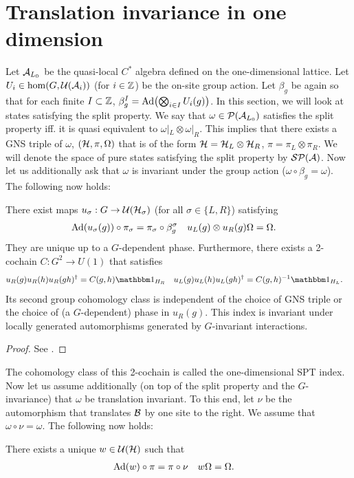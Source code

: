 \documentclass[11pt,a4paper,twoside]{article}
\numberwithin{equation}{section}
\begin{document}
	\section{Translation invariance in one dimension}\label{sec:OneDimensionalIndices}
	Let $\AA_{L_0}$ be the quasi-local $C^*$ algebra defined on the one-dimensional lattice. Let $U_i\in\hom(G,\UU(\AA_i))$ (for $i\in\ZZ$) be the on-site group action. Let $\beta_g$ be again so that for each finite $I\subset \ZZ$, $\beta_g^I=\Ad{\bigotimes_{i\in I}U_i(g)}$. In this section, we will look at states satisfying the split property. We say that $\omega\in\PP(\AA_{L_0})$ satisfies the split property iff. it is quasi equivalent to $\omega|_{L}\otimes\omega|_{R}$. This implies that there exists a GNS triple of $\omega$, $(\HH,\pi,\Omega)$ that is of the form $\HH=\HH_L\otimes\HH_R$, $\pi=\pi_L\otimes\pi_R$. We will denote the space of pure states satisfying the split property by $\mathcal{S}\PP(\AA)$. Now let us additionally ask that $\omega$ is invariant under the group action ($\omega\circ\beta_g=\omega$). The following now holds:
	\begin{lemma}
		There exist maps $u_\sigma:G\rightarrow \UU(\HH_\sigma)$ (for all $\sigma\in\{L,R\}$) satisfying
		\begin{align}
			\Ad{u_\sigma(g)}\circ\pi_\sigma&=\pi_\sigma\circ\beta_g^\sigma&u_L(g)\otimes u_R(g)\Omega&=\Omega.
		\end{align}
		They are unique up to a $G$-dependent phase. Furthermore, there exists a 2-cochain $C:G^2\rightarrow U(1)$ that satisfies
		\begin{align}
			u_R(g)u_R(h)u_R(gh)^{\dagger}&=C(g,h)\id_{H_R}&u_L(g)u_L(h)u_L(gh)^{\dagger}&=C(g,h)^{-1}\id_{H_L}.
		\end{align}
		Its second group cohomology class is independent of the choice of GNS triple or the choice of (a $G$-dependent) phase in $u_R(g)$. This index is invariant under locally generated automorphisms generated by $G$-invariant interactions.
	\end{lemma}
	\begin{proof}
		See \cite{ogata2019classification}.
	\end{proof}
	The cohomology class of this 2-cochain is called the one-dimensional SPT index. Now let us assume additionally (on top of the split property and the $G$-invariance) that $\omega$ be translation invariant. To this end, let $\nu$ be the automorphism that translates $\BB$ by one site to the right. We assume that $\omega\circ\nu=\omega$. The following now holds:
	\begin{lemma}
		There exists a unique $w\in\UU(\HH)$ such that
		\begin{align}
			\Ad{w}\circ\pi&=\pi\circ\nu&w\Omega&=\Omega.
		\end{align}
	\end{lemma}
\end{document}

